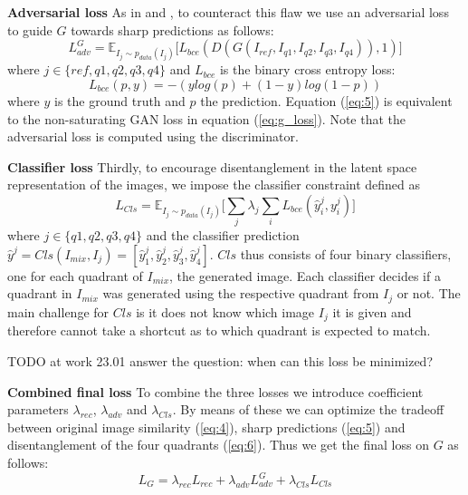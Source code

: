 \documentclass[12pt,a4paper]{article}
\begin{document}
\textbf{Adversarial loss} As in \cite{1711.07410} and \cite{1511.05440}, to counteract this flaw we use an adversarial loss to guide $G$ towards sharp predictions as follows:
\begin{equation} \label{eq:5}
    L^G_{adv} = \mathbb{E}_{I_{j}\sim p_{data} (I_{j})}\big[ L_{bce}(D(G(I_{ref},I_{q1},I_{q2},I_{q3},I_{q4})), 1)\big]
\end{equation}
where $j \in \{ref,q1,q2,q3,q4\}$ and $L_{bce}$ is the binary cross entropy loss:
\begin{equation} \label{eq:6}
    L_{bce}(p, y) = -(ylog(p) + (1 - y)log(1-p))
\end{equation}
where $y$ is the ground truth and $p$ the prediction. Equation (\ref{eq:5}) is equivalent to the non-saturating GAN loss in equation (\ref{eq:g_loss}). Note that the adversarial loss is computed using the discriminator.

\textbf{Classifier loss} Thirdly, to encourage disentanglement in the latent space representation of the images, we impose the classifier constraint defined as
\begin{equation} \label{eq:7}
    L_{Cls} = \mathbb{E}_{I_{j}\sim p_{data} (I_{j})}\big[\sum_{j} \lambda_j \sum_{i} L_{bce}(\hat{y}^j_i, y^j_i)\big]
\end{equation}
where $j \in \{q1,q2,q3,q4\}$ and the classifier prediction $\hat{y}^j = Cls(I_{mix}, I_j) = [\hat{y}^j_1, \hat{y}^j_2, \hat{y}^j_3, \hat{y}^j_4]$. $Cls$ thus consists of four binary classifiers, one for each quadrant of $I_{mix}$, the generated image. Each classifier decides if a quadrant in $I_{mix}$ was generated using the respective quadrant from $I_j$ or not. The main challenge for $Cls$ is it does not know which image $I_j$ it is given and therefore cannot take a shortcut as to which quadrant is expected to match.

TODO at work 23.01 answer the question: when can this loss be minimized?

\textbf{Combined final loss} To combine the three losses we introduce coefficient parameters $\lambda_{rec}$, $\lambda_{adv}$ and $\lambda_{Cls}$. By means of these we can optimize the tradeoff between original image similarity (\ref{eq:4}), sharp predictions (\ref{eq:5}) and disentanglement of the four quadrants (\ref{eq:6}). Thus we get the final loss on $G$ as follows:
\begin{equation} \label{eq:g_loss_comp}
    L_{G} = \lambda_{rec} L_{rec} + \lambda_{adv} L^G_{adv} + \lambda_{Cls} L_{Cls}
\end{equation}
\end{document}
